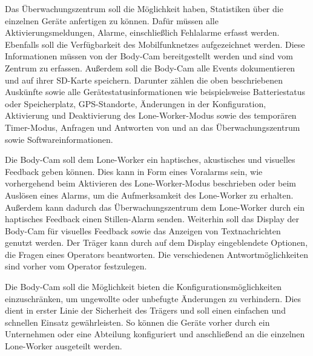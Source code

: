 \documentclass[thesis.tex]{subfiles}
\begin{document}
Das Überwachungszentrum soll die Möglichkeit haben, Statistiken über die einzelnen Geräte anfertigen zu können.
Dafür müssen alle Aktivierungsmeldungen, Alarme, einschließlich Fehlalarme erfasst werden.
Ebenfalls soll die Verfügbarkeit des Mobilfunknetzes aufgezeichnet werden.
Diese Informationen müssen von der Body-Cam bereitgestellt werden und sind vom Zentrum zu erfassen.
Außerdem soll die Body-Cam alle Events dokumentieren und auf ihrer SD-Karte speichern.
Darunter zählen die oben beschriebenen Auskünfte sowie alle Gerätestatusinformationen wie beispielsweise Batteriestatus
oder Speicherplatz, GPS-Standorte, Änderungen in der Konfiguration, Aktivierung und Deaktivierung des Lone-Worker-Modus
sowie des temporären Timer-Modus, Anfragen und Antworten von und an das Überwachungszentrum sowie Softwareinformationen.

Die Body-Cam soll dem Lone-Worker ein haptisches, akustisches und visuelles Feedback geben können.
Dies kann in Form eines Voralarms sein, wie vorhergehend beim Aktivieren des Lone-Worker-Modus beschrieben oder beim Auslösen eines Alarms, um die Aufmerksamkeit des Lone-Worker zu erhalten.
Außerdem kann dadurch das Überwachungszentrum dem Lone-Worker durch ein haptisches Feedback einen \glqq Stillen\grqq{}-Alarm senden.
Weiterhin soll das Display der Body-Cam für visuelles Feedback sowie das Anzeigen von Textnachrichten genutzt werden.
Der Träger kann durch auf dem Display eingeblendete Optionen, die Fragen eines Operators beantworten.
Die verschiedenen Antwortmöglichkeiten sind vorher vom Operator festzulegen.

Die Body-Cam soll die Möglichkeit bieten die Konfigurationsmöglichkeiten einzuschränken, um ungewollte oder unbefugte Änderungen zu verhindern.
Dies dient in erster Linie der Sicherheit des Trägers und soll einen einfachen und schnellen Einsatz gewährleisten.
So können die Geräte vorher durch ein Unternehmen oder eine Abteilung konfiguriert und anschließend an die einzelnen Lone-Worker ausgeteilt werden.

\subfilebib %
\end{document}
